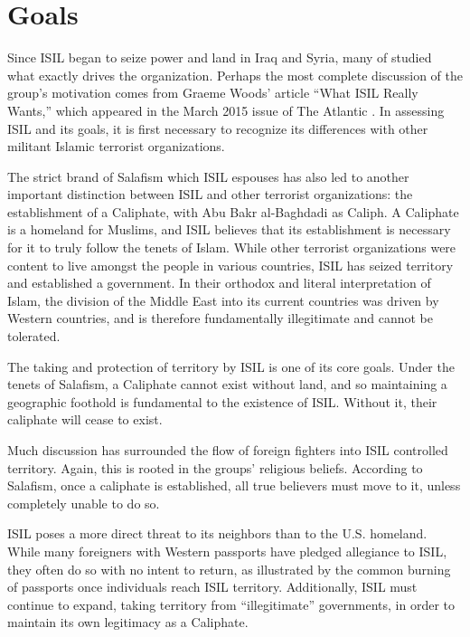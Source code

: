 \documentclass{report}
\begin{document}
 
    


\section{Goals}


Since ISIL began to seize power and land in Iraq and Syria, many of studied what exactly drives the organization. Perhaps the most complete discussion of the group's motivation comes from Graeme Woods' article \enquote{What ISIL Really Wants,} which appeared in the March 2015 issue of The Atlantic \cite{Wood2015}. In assessing ISIL and its goals, it is first necessary to recognize its differences with other militant Islamic terrorist organizations. 



The strict brand of Salafism which ISIL espouses has also led to another important distinction between ISIL and other terrorist organizations: the establishment of a Caliphate, with Abu Bakr al-Baghdadi as Caliph. A Caliphate is a homeland for Muslims, and ISIL believes that its establishment is necessary for it to truly follow the tenets of Islam. While other terrorist organizations were content to live amongst the people in various countries, ISIL has seized territory and established a government. In their orthodox and literal interpretation of Islam, the division of the Middle East into its current countries was driven by Western countries, and is therefore fundamentally illegitimate and cannot be tolerated. 

The taking and protection of territory by ISIL is one of its core goals. Under the tenets of Salafism, a Caliphate cannot exist without land, and so maintaining a geographic foothold is fundamental to the existence of ISIL. Without it, their caliphate will cease to exist. 

Much discussion has surrounded the flow of foreign fighters into ISIL controlled territory. Again, this is rooted in the groups' religious beliefs. According to Salafism, once a caliphate is established, all true believers must move to it, unless completely unable to do so. 

ISIL poses a more direct threat to its neighbors than to the U.S. homeland. While many foreigners with Western passports have pledged allegiance to ISIL, they often do so with no intent to return, as illustrated by the common burning of passports once individuals reach ISIL territory. Additionally, ISIL must continue to expand, taking territory from \enquote{illegitimate} governments, in order to maintain its own legitimacy as a Caliphate. 
\end{document}
